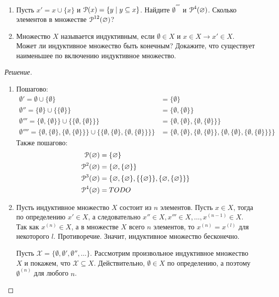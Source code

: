     \begin{problem}[5]
        \begin{enumerate}[label=(\alph{*})]
            \item Пусть \(x' = x \cup \{x\}\) и \(\operatorname{\mathcal{P}}(x) = \{y \mid y \subseteq x\}\). Найдите \(\emptyset^{''''}\) и \(\operatorname{\mathcal{P}}^4(\varnothing)\). Сколько элементов в множестве \(\operatorname{\mathcal{P}}^{12}(\varnothing)\)?
            \item Множество \(X\) называется индуктивным, если \(\emptyset \in X\) и \(x \in X \to x' \in X\). Может ли индуктивное множество быть конечным? Докажите, что существует наименьшее по включению индуктивное множество.
        \end{enumerate}
    \end{problem}
    \begin{proof}[Решение]
        \begin{enumerate}[label=(\alph{*})]
            \item Пошагово:
            \begin{align*}
                \emptyset' = \emptyset \cup \{\emptyset\} &= \{\emptyset\} \\
                \emptyset'' = \{\emptyset\} \cup \{\{\emptyset\}\} &= \{\emptyset, \{\emptyset\}\} \\
                \emptyset''' = \{\emptyset, \{\emptyset\}\} \cup \{\{\emptyset, \{\emptyset\}\}\} &= \{\emptyset, \{\emptyset\}, \{\emptyset, \{\emptyset\}\}\} \\
                \emptyset'''' = \{\emptyset, \{\emptyset\}, \{\emptyset, \{\emptyset\}\}\} \cup \{\{\emptyset, \{\emptyset\}, \{\emptyset, \{\emptyset\}\}\}\} &= \{\emptyset, \{\emptyset\}, \{\emptyset, \{\emptyset\}\}, \{\emptyset, \{\emptyset\}, \{\emptyset, \{\emptyset\}\}\}\}
            \end{align*}
            Также пошагово:
            \begin{align*}
                \operatorname{\mathcal{P}}(\varnothing) &= \{\varnothing\} \\
                \operatorname{\mathcal{P}}^2 (\varnothing) &= \{\varnothing, \{\varnothing\}\} \\
                \operatorname{\mathcal{P}}^3 (\varnothing) &= \{\varnothing, \{\varnothing\}, \{\{\varnothing\}\}, \{\varnothing, \{\varnothing\}\}\} \\
                \operatorname{\mathcal{P}}^4 (\varnothing) &= TODO
            \end{align*}
            \item Пусть индуктивное множество \(X\) состоит из \(n\) элементов. Пусть \(x \in X\), тогда по определению \(x' \in X\), а следовательно \(x'' \in X, x''' \in X, \ldots, x^{(n-1)} \in X\). Так как \(x^{(n)} \in X\), а в множестве \(X\) всего \(n\) элементов, то \(x^{(n)} = x^{(l)}\) для некоторого \(l\). Противоречие. Значит, индуктивное множество бесконечно.
            
            Пусть \(\mathcal{X} = \{\emptyset, \emptyset', \emptyset'', \ldots\}\). Рассмотрим произвольное индуктивное множество \(X\) и покажем, что \(\mathcal{X} \subseteq X\). Действительно, \(\emptyset \in X\) по определению, а поэтому \(\emptyset^{(n)}\) для любого \(n\).
        \end{enumerate}
    \end{proof}
